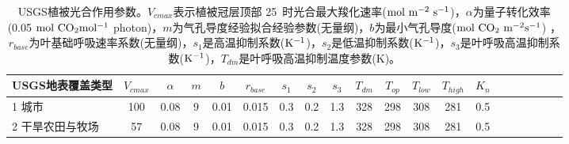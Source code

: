 \begin{sidewaystable}[]
    \centering
    \caption{USGS植被光合作用参数。$V_{cmax}$表示植被冠层顶部 25~\textcelsius 时光合最大羧化速率($\rm mol\ m^{-2}\ s^{-1}$)，$\alpha$为量子转化效率(0.05 $\rm mol\ CO_2 mol^{-1}$ photon)，$m$为气孔导度经验拟合经验参数(无量纲)，$b$为最小气孔导度($\rm mol\ CO_2\ m^{-2}s^{-1}$) ，
    $r_{base}$为叶基础呼吸速率系数(无量纲)，$s_1$是高温抑制系数($\rm K^{-1}$)，$s_2$是低温抑制系数($\rm K^{-1}$)，$s_3$是叶呼吸高温抑制系数($\rm K^{-1}$)，$T_{dm}$是叶呼吸高温抑制温度参数(K)。}
    \label{tab:USGS植被光合作用参数1}
    \begin{tabular}{@{}lccccccccccccccccccc@{}}
    \toprule
    USGS地表覆盖类型     &$ V_{cmax}$ & $\alpha$ & $m$& $b$ & $r_{base}$ & $s_1$ & $s_2$ & $s_3$ & $T_{dm}$ & $T_{op}$ & $T_{low}$ & $T_{high}$ & $K_n$  \\ \midrule
    1 城市           & 100                                                               & 0.08                                                                                                   & 9                                                                                  & 0.01                                                                               & 0.015                                                               & 0.3                                                       & 0.2                                                       & 1.3                                                       & 328                                                             & 298                                                             & 308                                                              & 281                                                               & 0.5                                                          \\
    2 干旱农田与牧场      & 57                                                                & 0.08                                                                                                   & 9                                                                                  & 0.01                                                                               & 0.015                                                               & 0.3                                                       & 0.2                                                       & 1.3                                                       & 328                                                             & 298                                                             & 308                                                              & 281                                                               & 0.5                                                          \\

\end{tabular}
\end{sidewaystable}
